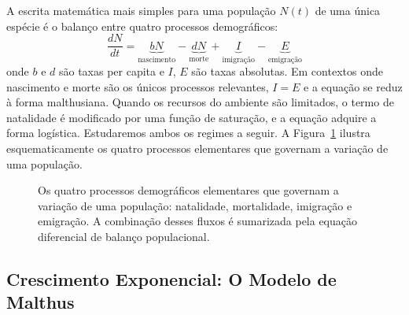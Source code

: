 A escrita matemática mais simples para uma população $N(t)$ de uma única
espécie é o balanço entre quatro processos demográficos:
\begin{equation}
\frac{dN}{dt} = \underbrace{b N}_{\text{nascimento}}
               - \underbrace{d N}_{\text{morte}}
               + \underbrace{I}_{\text{imigração}}
               - \underbrace{E}_{\text{emigração}}
\end{equation}
onde $b$ e $d$ são taxas per capita e $I$, $E$ são taxas absolutas. Em
contextos onde nascimento e morte são os únicos processos relevantes, $I = E$
e a equação se reduz à forma malthusiana. Quando os recursos do ambiente são
limitados, o termo de natalidade é modificado por uma função de saturação, e a
equação adquire a forma logística. Estudaremos ambos os regimes a seguir. A
Figura~\ref{fig:10-processos-fundamentais} ilustra esquematicamente os quatro
processos elementares que governam a variação de uma população.

\begin{figure}[htbp]
\centering
{}
\caption{Os quatro processos demográficos elementares que governam a variação de uma população: natalidade, mortalidade, imigração e emigração. A combinação desses fluxos é sumarizada pela equação diferencial de balanço populacional.}
\label{fig:10-processos-fundamentais}
\end{figure}

\subsection{Crescimento Exponencial: O Modelo de Malthus}
\label{sub:image10-exponencial}

